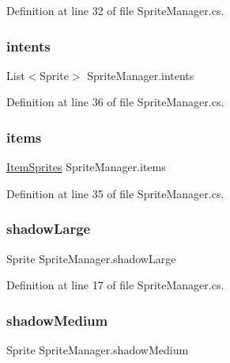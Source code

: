 Definition at line 32 of file Sprite\+Manager.\+cs.

\mbox{\label{class_sprite_manager_aa89806bcec93d42c07a903b9739adf4f}} 
\subsubsection{\texorpdfstring{intents}{intents}}
{\footnotesize\ttfamily List$<$Sprite$>$ Sprite\+Manager.\+intents}



Definition at line 36 of file Sprite\+Manager.\+cs.

\mbox{\label{class_sprite_manager_a9ff4e140b84b106de6f88d7b97d61483}} 
\subsubsection{\texorpdfstring{items}{items}}
{\footnotesize\ttfamily \mbox{\hyperlink{class_item_sprites}{Item\+Sprites}} Sprite\+Manager.\+items}



Definition at line 35 of file Sprite\+Manager.\+cs.

\mbox{\label{class_sprite_manager_a9dbc29720d2da6bf1134bc274660de70}} 
\subsubsection{\texorpdfstring{shadowLarge}{shadowLarge}}
{\footnotesize\ttfamily Sprite Sprite\+Manager.\+shadow\+Large}



Definition at line 17 of file Sprite\+Manager.\+cs.

\mbox{\label{class_sprite_manager_ad0c92cb2fd6fb3b89ae92e25afb276d9}} 
\subsubsection{\texorpdfstring{shadowMedium}{shadowMedium}}
{\footnotesize\ttfamily Sprite Sprite\+Manager.\+shadow\+Medium}



